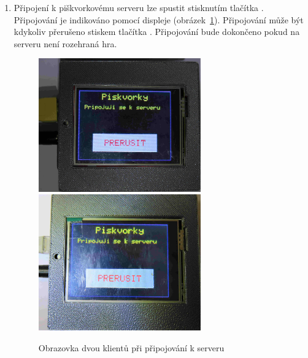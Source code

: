 \begin{enumerate}
\item Připojení k piškvorkovému serveru lze spustit stisknutím tlačítka . Připojování je indikováno pomocí displeje (obrázek~\ref{fig:faze2}). Připojování může být kdykoliv přerušeno stiskem tlačítka . Připojování bude dokončeno pokud na serveru není rozehraná hra.
\begin{figure}[H]
\centering
\includegraphics[width=7cm]{img/gameFlow/phase02a.jpg}
\includegraphics[width=7cm]{img/gameFlow/phase02b.jpg}
\caption{\label{fig:faze2} Obrazovka dvou klientů při připojování k serveru}
\end{figure}


\end{enumerate}
